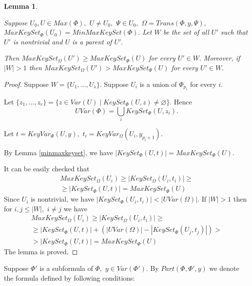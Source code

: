 \documentclass{au}
\theoremstyle{plain}
\newtheorem{lemma}{Lemma}
\theoremstyle{definition}
\theoremstyle{remark}
\numberwithin{equation}{section}
\begin{document}
\begin{lemma}\label{unionMaxKeySet}

Suppose $U_{0},U\in Max(\Phi),$ $U\neq U_{0},$
$\Psi\in U_{0},$
$\Omega = Trans(\Phi, y, \Psi),$
$MaxKeySet_{\Phi}(U_{0})=MinMaxKeySet(\Phi).$
Let $W$ be the set of all $U'$ such that
$U'$ is nontrivial and $U$ is a parent of $U'.$

Then $MaxKeySet_{\Omega}(U')\ge MaxKeySet_{\Phi}(U)$ for every $U'\in W.$
Moreover, if $|W|>1$ then
$MaxKeySet_{\Omega}(U')>MaxKeySet_{\Phi}(U)$ for every $U'\in W.$

\end{lemma}

\begin{proof}

Suppose $W = \{U_{1},\ldots,U_{s}\}.$
Suppose $U_{i}$ is a union of $\Phi_{p_{i}}$ for every $i.$

Let $\{z_{1},\ldots,z_{r}\} = \{z\in Var(U) \;|\; KeySet_{\Phi}(U,z)\neq \varnothing\}.$
Hence $$UVar(\Phi) = \bigcup \limits_{i} KeySet_{\Phi}(U,z_{i}).$$

Let $t = KeyVar_{\Phi}(U,y),$
$t_{i} = KeyVar_{\Omega}(U_{i},y_{p_{i}+1}).$

By Lemma \ref{minmaxkeyset}, we have $|KeySet_{\Phi}(U,t)| = MaxKeySet_{\Phi}(U).$

It can be easily checked that
\begin{multline*}
MaxKeySet_{\Omega}(U_{i})\ge |KeySet_{\Omega}(U_{i},t_{i})|\ge \\ \ge |KeySet_{\Phi}(U,t)| =  MaxKeySet_{\Phi}(U) 
\end{multline*}
Since $U_{i}$  is nontrivial,
we have $|KeySet_{\Phi}(U_{i},t_{i})|<|UVar(\Omega)|.$
If $|W|>1$ then for $i,j\le |W|,$ $i\neq j$  we have
\begin{multline*}MaxKeySet_{\Omega}(U_{i})\ge |KeySet_{\Omega}(U_{i},t_{i})|\ge \\ 
\ge |KeySet_{\Phi}(U,t)| +(|UVar(\Omega)|-|KeySet_{\Phi}(U_{j},t_{j})|)>\\
> |KeySet_{\Phi}(U,t)| =  MaxKeySet_{\Phi}(U)
\end{multline*}
The lemma is proved.

\end{proof}

Suppose $\Phi'$ is a subformula of $\Phi,$
$y\in Var(\Phi').$
By $Part(\Phi,\Phi',y)$ we denote the formula defined by following conditions:
\end{document}
